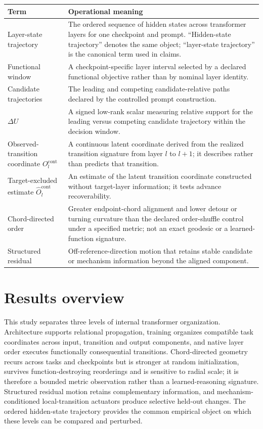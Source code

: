 \documentclass[11pt]{article}
\begin{document}
\begin{table}[H]
\centering\scriptsize\sloppy
\begin{tabularx}{\textwidth}{@{}XX@{}}
\toprule
Term & Operational meaning \\
\midrule
Layer-state trajectory & The ordered sequence of hidden states across transformer layers for one checkpoint and prompt. “Hidden-state trajectory” denotes the same object; “layer-state trajectory” is the canonical term used in claims. \\
Functional window & A checkpoint-specific layer interval selected by a declared functional objective rather than by nominal layer identity. \\
Candidate trajectories & The leading and competing candidate-relative paths declared by the controlled prompt construction. \\
\(\Delta U\) & A signed low-rank scalar measuring relative support for the leading versus competing candidate trajectory within the decision window. \\
Observed-transition coordinate \(O_l^{\mathrm{cont}}\) & A continuous latent coordinate derived from the realized transition signature from layer \(l\) to \(l+1\); it describes rather than predicts that transition. \\
Target-excluded estimate \(\widehat O_l^{\mathrm{cont}}\) & An estimate of the latent transition coordinate constructed without target-layer information; it tests advance recoverability. \\
Chord-directed order & Greater endpoint-chord alignment and lower detour or turning curvature than the declared order-shuffle control under a specified metric; not an exact geodesic or a learned-function signature. \\
Structured residual & Off-reference-direction motion that retains stable candidate or mechanism information beyond the aligned component. \\
\bottomrule
\end{tabularx}
\end{table}

\section*{Results overview}
This study separates three levels of internal transformer organization. Architecture supports relational propagation, training organizes compatible task coordinates across input, transition and output components, and native layer order executes functionally consequential transitions. Chord-directed geometry recurs across tasks and checkpoints but is stronger at random initialization, survives function-destroying reorderings and is sensitive to radial scale; it is therefore a bounded metric observation rather than a learned-reasoning signature. Structured residual motion retains complementary information, and mechanism-conditioned local-transition actuators produce selective held-out changes. The ordered hidden-state trajectory provides the common empirical object on which these levels can be compared and perturbed.
\end{document}

